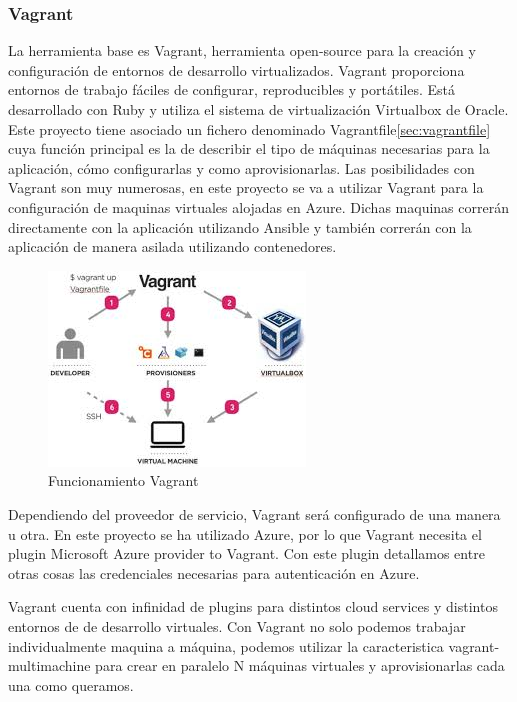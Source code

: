 \documentclass[a4paper,11pt]{book}
\begin{document}
\subsubsection{Vagrant}

La herramienta base es Vagrant\cite{vg}, herramienta open-source para la creación y configuración de entornos de desarrollo virtualizados. Vagrant proporciona entornos de trabajo fáciles de configurar, reproducibles y portátiles. Está desarrollado con Ruby y utiliza el sistema de virtualización Virtualbox de Oracle. Este proyecto tiene asociado un fichero denominado Vagrantfile\ref{sec:vagrantfile} cuya función principal es la de describir el tipo de máquinas necesarias para la aplicación, cómo configurarlas y como aprovisionarlas. Las posibilidades con Vagrant son muy numerosas, en este proyecto se va a utilizar Vagrant para la configuración de maquinas virtuales alojadas en Azure. Dichas maquinas correrán directamente con la aplicación utilizando Ansible y también correrán con la aplicación de manera asilada utilizando contenedores. 

\begin{figure}[H] 
\centering 
\includegraphics[scale=0.95]{imagenes/desarrollo_herramienta/vagrant.jpeg}
\caption{ Funcionamiento Vagrant\cite{vg2}}
\end{figure}


Dependiendo del proveedor de servicio, Vagrant será configurado de una manera u otra. En este proyecto se ha utilizado Azure, por lo que Vagrant necesita el plugin Microsoft Azure provider to Vagrant. Con este plugin detallamos entre otras cosas las credenciales necesarias para autenticación en Azure.

Vagrant cuenta con infinidad de plugins para distintos cloud services y distintos entornos de de desarrollo virtuales. Con Vagrant no solo podemos trabajar individualmente maquina a máquina, podemos utilizar la caracteristica vagrant-multimachine para crear en paralelo N máquinas virtuales y aprovisionarlas cada una como queramos. 
\end{document}
